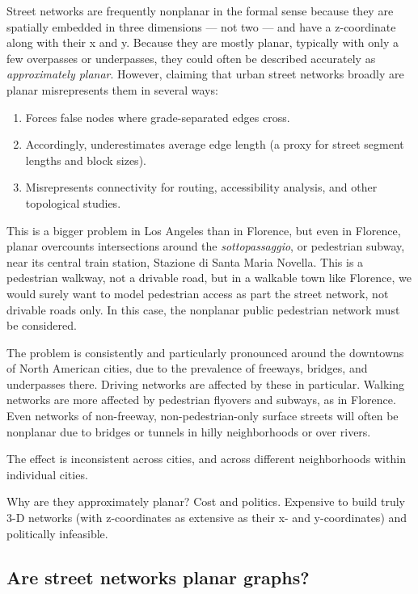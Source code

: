 \documentclass[Afour,sageh,times]{sagej}
\begin{document}
Street networks are frequently nonplanar in the formal sense because they are spatially embedded in three dimensions --- not two --- and have a z-coordinate along with their x and y. Because they are mostly planar, typically with only a few overpasses or underpasses, they could often be described accurately as \emph{approximately planar}. However, claiming that urban street networks broadly are planar misrepresents them in several ways:

\begin{enumerate}
	\item{Forces false nodes where grade-separated edges cross.}
	\item{Accordingly, underestimates average edge length (a proxy for street segment lengths and block sizes).}
	\item{Misrepresents connectivity for routing, accessibility analysis, and other topological studies.}
\end{enumerate}

This is a bigger problem in Los Angeles than in Florence, but even in Florence, planar overcounts intersections around the \textit{sottopassaggio}, or pedestrian subway, near its central train station, Stazione di Santa Maria Novella. This is a pedestrian walkway, not a drivable road, but in a walkable town like Florence, we would surely want to model pedestrian access as part the street network, not drivable roads only. In this case, the nonplanar public pedestrian network must be considered.

The problem is consistently and particularly pronounced around the downtowns of North American cities, due to the prevalence of freeways, bridges, and underpasses there. Driving networks are affected by these in particular. Walking networks are more affected by pedestrian flyovers and subways, as in Florence. Even networks of non-freeway, non-pedestrian-only surface streets will often be nonplanar due to bridges or tunnels in hilly neighborhoods or over rivers.

The effect is inconsistent across cities, and across different neighborhoods within individual cities.

Why are they approximately planar? Cost and politics. Expensive to build truly 3-D networks (with z-coordinates as extensive as their x- and y-coordinates) and politically infeasible.

\subsection{Are street networks planar graphs?}
\end{document}
